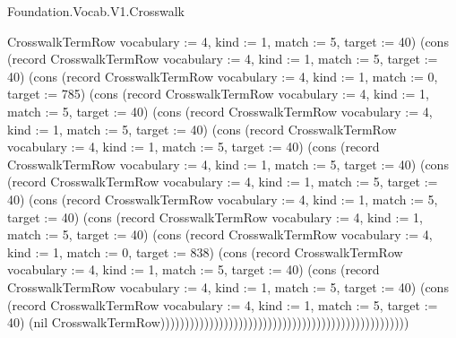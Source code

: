 \begin{lexlean}{Foundation.Vocab.V1.Crosswalk}
\begin{semanticmodule}
{CrosswalkTermRow {vocabulary := 4, kind := 1, match := 5, target := 40}) (cons (record CrosswalkTermRow {vocabulary := 4, kind := 1, match := 5, target := 40}) (cons (record CrosswalkTermRow {vocabulary := 4, kind := 1, match := 0, target := 785}) (cons (record CrosswalkTermRow {vocabulary := 4, kind := 1, match := 5, target := 40}) (cons (record CrosswalkTermRow {vocabulary := 4, kind := 1, match := 5, target := 40}) (cons (record CrosswalkTermRow {vocabulary := 4, kind := 1, match := 5, target := 40}) (cons (record CrosswalkTermRow {vocabulary := 4, kind := 1, match := 5, target := 40}) (cons (record CrosswalkTermRow {vocabulary := 4, kind := 1, match := 5, target := 40}) (cons (record CrosswalkTermRow {vocabulary := 4, kind := 1, match := 5, target := 40}) (cons (record CrosswalkTermRow {vocabulary := 4, kind := 1, match := 5, target := 40}) (cons (record CrosswalkTermRow {vocabulary := 4, kind := 1, match := 0, target := 838}) (cons (record CrosswalkTermRow {vocabulary := 4, kind := 1, match := 5, target := 40}) (cons (record CrosswalkTermRow {vocabulary := 4, kind := 1, match := 5, target := 40}) (cons (record CrosswalkTermRow {vocabulary := 4, kind := 1, match := 5, target := 40}) (nil CrosswalkTermRow)))))))))))))))))))))))))))))))))))))))))))))))))))
}


\end{semanticmodule}
\end{lexlean}
